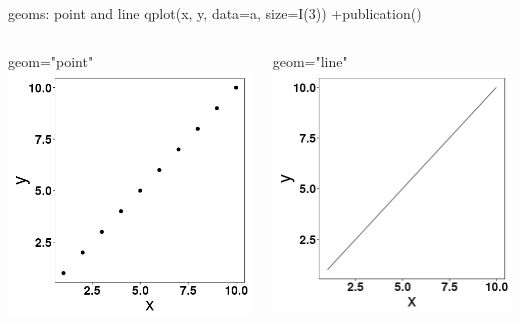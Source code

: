 \documentclass[t,10pt]{beamer}
\begin{document}
\begin{frame}[label={sec:orgheadline13}]{geoms: point and line qplot(x, y, data=a, size=I(3)) +publication()}
\begin{columns}
\begin{column}{0.5\columnwidth}
\begin{block}{geom="point"}
\includegraphics[width=.9\linewidth]{./point.png}
\end{block}
\end{column}

\begin{column}{0.5\columnwidth}
\begin{block}{geom="line"}
\includegraphics[width=.9\linewidth]{./line.png}
\end{block}
\end{column}
\end{columns}
\end{frame}
\end{document}
